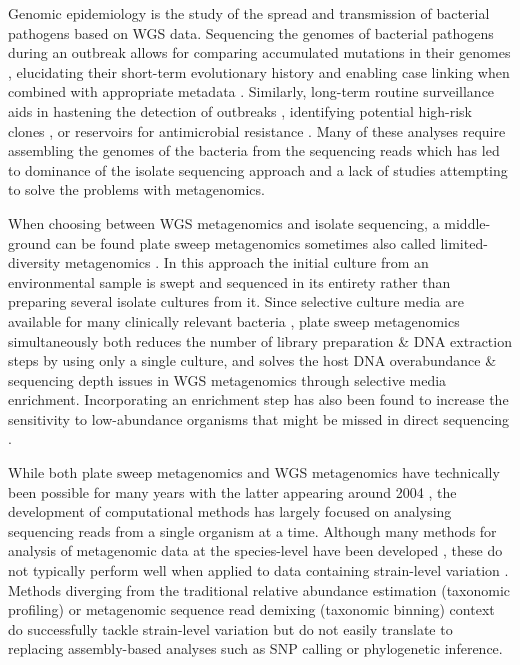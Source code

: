 \documentclass[officiallayout]{tktla}
\begin{document}
Genomic epidemiology is the study of the spread and transmission of
bacterial pathogens based on WGS data. Sequencing the genomes of
bacterial pathogens during an outbreak allows for comparing
accumulated mutations in their genomes \citep{tang2017infection},
elucidating their short-term evolutionary history and enabling case
linking when combined with appropriate metadata
\citep{grad2014epidemiologic, hill2021progress}. Similarly, long-term
routine surveillance aids in hastening the detection of outbreaks
\citep{eyre2012pilot, gardy2018towards}, identifying potential
high-risk clones \citep{aanensen2016whole}, or reservoirs for
antimicrobial resistance \citep{weingarten2018genomic,
  coipan2020genomic}. Many of these analyses require assembling the
genomes of the bacteria from the sequencing reads which has led to
dominance of the isolate sequencing approach and a lack of studies
attempting to solve the problems with metagenomics.

When choosing between WGS metagenomics and isolate sequencing, a
middle-ground can be found plate sweep metagenomics
\cite{maklin_high-resolution_2021} \textemdash sometimes also called
limited-diversity metagenomics \citep{cocker_drivers_2022}. In this
approach the initial culture from an environmental sample is swept
and sequenced in its entirety rather than preparing several isolate
cultures from it. Since selective culture media are available for many
clinically relevant bacteria \citep{lagier2015current}, plate sweep
metagenomics simultaneously both reduces the number of library
preparation \& DNA extraction steps by using only a single culture,
and solves the host DNA overabundance \& sequencing depth issues in
WGS metagenomics through selective media enrichment. Incorporating an
enrichment step has also been found to increase the sensitivity to
low-abundance organisms that might be missed in direct sequencing
\citep{whelan2020culture}.

While both plate sweep metagenomics and WGS metagenomics have
technically been possible for many years with the latter appearing
around 2004 \citep{tyson2004community, venter2004environmental}, the
development of computational methods has largely focused on analysing
sequencing reads from a single organism at a time. Although many
methods for analysis of metagenomic data at the species-level have
been developed \citep{breitwieser2019review}, these do not typically
perform well when applied to data containing strain-level variation
\citep{sczyrba2017critical}. Methods diverging from the traditional
relative abundance estimation (taxonomic profiling)
\citep{truong2017microbial} or metagenomic sequence read demixing
(taxonomic binning) \citep{van2022strainge} context do successfully
tackle strain-level variation but do not easily translate to replacing
assembly-based analyses such as SNP calling or phylogenetic inference.
\end{document}
